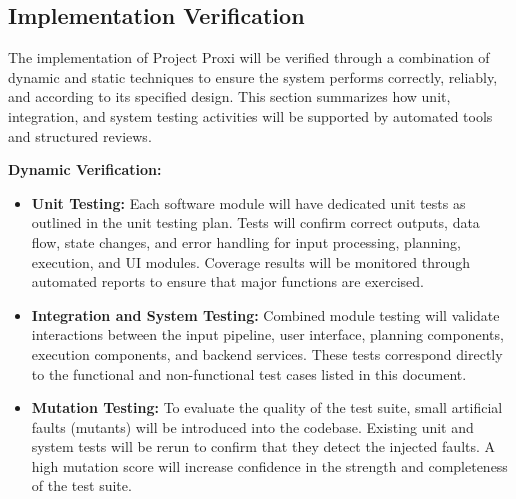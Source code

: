 \documentclass[12pt, titlepage]{article}
\begin{document}
\subsection{Implementation Verification}

The implementation of Project Proxi will be verified through a combination of
dynamic and static techniques to ensure the system performs correctly,
reliably, and according to its specified design. This section summarizes how
unit, integration, and system testing activities will be supported by
automated tools and structured reviews.

\vspace{0.5em}
\noindent\textbf{Dynamic Verification:}
\begin{itemize}
\item \textbf{Unit Testing:}
  Each software module will have dedicated unit tests as outlined in the unit
  testing plan. Tests will confirm correct outputs, data flow, state changes,
  and error handling for input processing, planning, execution, and UI
  modules. Coverage results will be monitored through automated reports to
  ensure that major functions are exercised.

\item \textbf{Integration and System Testing:}
  Combined module testing will validate interactions between the input
  pipeline, user interface, planning components, execution components, and
  backend services. These tests correspond directly to the functional and
  non-functional test cases listed in this document.

\item \textbf{Mutation Testing:}
  To evaluate the quality of the test suite, small artificial faults
  (mutants) will be introduced into the codebase. Existing unit and system
  tests will be rerun to confirm that they detect the injected faults. A high
  mutation score will increase confidence in the strength and completeness of
  the test suite.
\end{itemize}
\end{document}

